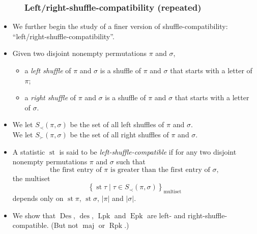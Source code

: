 \documentclass{beamer}
\newcommand{\Lpk}{\operatorname{Lpk}}
\newcommand{\Rpk}{\operatorname{Rpk}}
\newcommand{\Epk}{\operatorname{Epk}}
\newcommand{\Des}{\operatorname{Des}}
\newcommand{\des}{\operatorname{des}}
\newcommand{\maj}{\operatorname{maj}}
\newcommand{\st}{\operatorname{st}}
\newcommand{\fti}[1]{\frametitle{\ \ \ \ \ #1}}
\newcommand{\set}[1]{\left\{ #1 \right\}}
\newcommand{\abs}[1]{\left| #1 \right|}
\newcommand{\tup}[1]{\left( #1 \right)}
\newcommand{\defn}[1]{{\color{darkred}\emph{#1}}} %
\theoremstyle{plain}
\begin{document}
\begin{frame}
\fti{Left/right-shuffle-compatibility (repeated)}

\begin{itemize}

\item We further begin the study of a finer version of
      shuffle-compatibility: ``left/right-shuffle-compatibility''.

\item Given two disjoint nonempty permutations $\pi$ and $\sigma$,
      \begin{itemize}
      \item
      a \defn{left shuffle} of $\pi$ and $\sigma$ is a shuffle
      of $\pi$ and $\sigma$ that starts with a letter of $\pi$;
      \item
      a \defn{right shuffle} of $\pi$ and $\sigma$ is a shuffle
      of $\pi$ and $\sigma$ that starts with a letter of $\sigma$.
      \end{itemize}

\item We let $S_\prec \tup{\pi, \sigma}$ be the set of all left shuffles of $\pi$
      and $\sigma$. \\
      We let $S_\succ \tup{\pi, \sigma}$ be the set of all right shuffles of $\pi$
      and $\sigma$.

\item A statistic $\st$ is said to be \defn{left-shuffle-compatible}
      if for any two disjoint nonempty permutations $\pi$ and $\sigma$
      such that
      \[
      \text{the first entry of }\pi\text{ is greater than the first entry of }%
      \sigma,
      \]
      the
      multiset
      \[
      \set{ \st\tau \mid \tau\in S_\prec \tup{\pi, \sigma} }_{\text{multiset}}
      \]
      depends only on $\st \pi$, $\st \sigma$, $\abs{\pi}$ and
      $\abs{\sigma}$. \\

\item We show that $\Des$, $\des$, $\Lpk$ and $\Epk$ are
      left- and right-shuffle-compatible.
      (But not $\maj$ or $\Rpk$.)

\end{itemize}

\end{frame}
\end{document}
